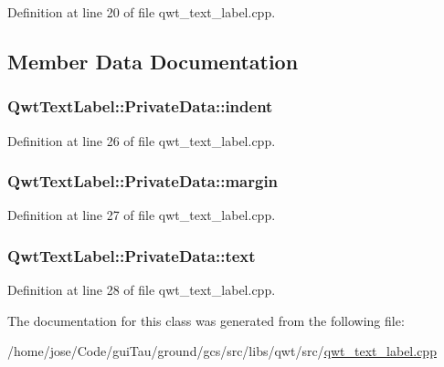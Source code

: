 Definition at line 20 of file qwt\-\_\-text\-\_\-label.\-cpp.



\subsection{Member Data Documentation}
\hypertarget{class_qwt_text_label_1_1_private_data_a53222be474ee23e4e96f52541fc03f9e}{
\subsubsection[{indent}]{ Qwt\-Text\-Label\-::\-Private\-Data\-::indent}}\label{class_qwt_text_label_1_1_private_data_a53222be474ee23e4e96f52541fc03f9e}


Definition at line 26 of file qwt\-\_\-text\-\_\-label.\-cpp.

\hypertarget{class_qwt_text_label_1_1_private_data_ada4c7cd061a5acb2a75bc99a02a2201a}{
\subsubsection[{margin}]{ Qwt\-Text\-Label\-::\-Private\-Data\-::margin}}\label{class_qwt_text_label_1_1_private_data_ada4c7cd061a5acb2a75bc99a02a2201a}


Definition at line 27 of file qwt\-\_\-text\-\_\-label.\-cpp.

\hypertarget{class_qwt_text_label_1_1_private_data_ab84b3e4919a4e255207fac09e9bc2679}{
\subsubsection[{text}]{ Qwt\-Text\-Label\-::\-Private\-Data\-::text}}\label{class_qwt_text_label_1_1_private_data_ab84b3e4919a4e255207fac09e9bc2679}


Definition at line 28 of file qwt\-\_\-text\-\_\-label.\-cpp.



The documentation for this class was generated from the following file\-:\begin{DoxyCompactItemize}
\item 
/home/jose/\-Code/gui\-Tau/ground/gcs/src/libs/qwt/src/\hyperlink{qwt__text__label_8cpp}{qwt\-\_\-text\-\_\-label.\-cpp}\end{DoxyCompactItemize}
